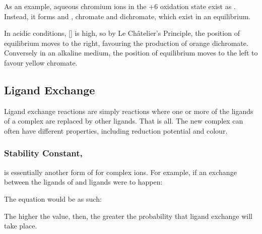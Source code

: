 				As an example, aqueous chromium ions in the +6 oxidation state  exist as . Instead, it
				forms  and , chromate and dichromate, which exist in an equilibrium.


				In acidic conditions, [] is high, so by Le Châtelier's Principle, the position of equilibrium moves to the right,
				favouring the production of orange dichromate. Conversely in an alkaline medium, the position of equilibrium moves to the left
				to favour yellow chromate.




		\pagebreak
		\subsection{Ligand Exchange}

			Ligand exchange reactions are simply reactions where one or more of the ligands of a complex are replaced by other ligands. That
			is all. The new complex can often have different properties, including reduction potential and colour.

			\subsubsection{Stability Constant, \MKstab{}}

				\Kstab{} is essentially another form of \Kc{} for complex ions. For example, if an exchange between the  ligands of
				 and \ch{\Cl-} ligands were to happen:


				The \Kstab{} equation would be as such:


				The higher the \Kstab{} value, then, the greater the probability that ligand exchange will take place.

